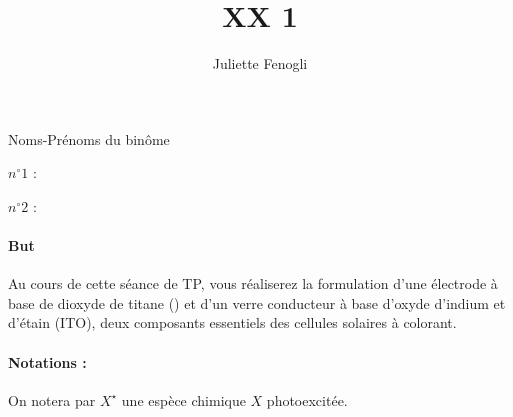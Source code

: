 \documentclass[twoside,a4paper,11pt,addpoints,answers]{exam}%
\title{XX 1}
\date{}
\author{Juliette Fenogli}
\begin{document}
\begin{minipage}{0.33\textwidth}
Noms-Prénoms du binôme
\end{minipage}\begin{minipage}{0.33\textwidth}
$n^\circ 1$ :
\end{minipage}\begin{minipage}{0.33\textwidth}
$n^\circ 2$ :
\end{minipage}




\paragraph*{But} 
Au cours de cette séance de TP, vous réaliserez la formulation d'une électrode à base de dioxyde de titane () et d'un verre conducteur à base d'oxyde d'indium et d'étain (ITO), deux composants essentiels des cellules solaires à colorant.

\paragraph*{Notations :}
On notera par $X^\star$ une espèce chimique $X$ photoexcitée.
\end{document}
